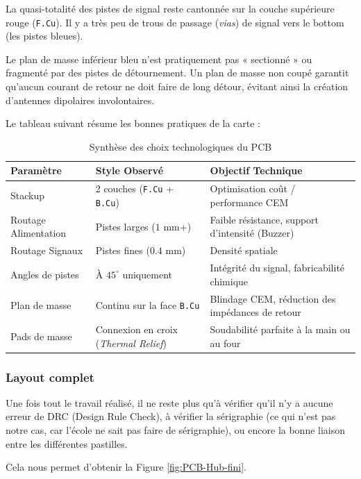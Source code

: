 La quasi-totalité des pistes de signal reste cantonnée sur la couche supérieure rouge 
(\texttt{F.Cu}). Il y a très peu de trous de passage (\textit{vias}) de signal vers
le bottom (les pistes bleues). 

Le plan de masse inférieur bleu n'est pratiquement pas « sectionné » ou
fragmenté par des pistes de détournement. Un plan de masse non coupé garantit
qu'aucun courant de retour ne doit faire de long détour, évitant ainsi la création
d'antennes dipolaires involontaires.

Le tableau suivant résume les bonnes pratiques de la carte :

\begin{table}[h!]
\centering
\caption{Synthèse des choix technologiques du PCB}
\label{tab:synthese_pcb}
\begin{tabular}{lll}
\toprule
\textbf{Paramètre} & \textbf{Style Observé} & \textbf{Objectif Technique} \\
\midrule
Stackup & 2 couches (\texttt{F.Cu} + \texttt{B.Cu}) & Optimisation coût / performance CEM \\
Routage Alimentation & Pistes larges ($1\text{ mm}$+) & Faible résistance, support d'intensité (Buzzer) \\
Routage Signaux & Pistes fines ($0.4\text{ mm}$) & Densité spatiale \\
Angles de pistes & À $45^\circ$ uniquement & Intégrité du signal, fabricabilité chimique \\
Plan de masse & Continu sur la face \texttt{B.Cu} & Blindage CEM, réduction des impédances de retour \\
Pads de masse & Connexion en croix (\textit{Thermal Relief}) & Soudabilité parfaite à la main ou au four \\
\bottomrule
\end{tabular}
\end{table}

\subsubsection*{Layout complet}

Une fois tout le travail réalisé, il ne reste plus qu'à vérifier qu'il n'y a aucune erreur de DRC (Design Rule Check), 
à vérifier la sérigraphie (ce qui n'est pas notre cas, car l'école ne sait pas faire de sérigraphie),
ou encore la bonne liaison entre les différentes pastilles.

Cela nous permet d'obtenir la Figure \ref{fig:PCB-Hub-fini}.

